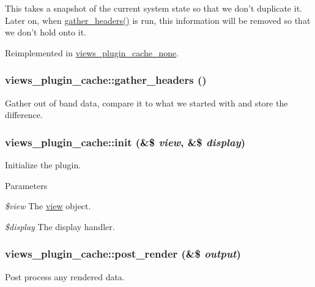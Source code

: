 This takes a snapshot of the current system state so that we don't duplicate it. Later on, when \hyperlink{classviews__plugin__cache_a557cef7540eec7d0a6ad9cd030724ef7}{gather\_\-headers()} is run, this information will be removed so that we don't hold onto it. 

Reimplemented in \hyperlink{classviews__plugin__cache__none_a17f65a53d00a8c51865027c3bce8172a}{views\_\-plugin\_\-cache\_\-none}.\hypertarget{classviews__plugin__cache_a557cef7540eec7d0a6ad9cd030724ef7}{
\subsubsection[{gather\_\-headers}]{\setlength{\rightskip}{0pt plus 5cm}views\_\-plugin\_\-cache::gather\_\-headers ()}}
\label{classviews__plugin__cache_a557cef7540eec7d0a6ad9cd030724ef7}
Gather out of band data, compare it to what we started with and store the difference. \hypertarget{classviews__plugin__cache_a6cecf3993f6314215559c6a914f8a96b}{
\subsubsection[{init}]{\setlength{\rightskip}{0pt plus 5cm}views\_\-plugin\_\-cache::init (\&\$ {\em view}, \/  \&\$ {\em display})}}
\label{classviews__plugin__cache_a6cecf3993f6314215559c6a914f8a96b}
Initialize the plugin.


\begin{DoxyParams}{Parameters}
\item[{\em \$view}]The \hyperlink{classview}{view} object. \item[{\em \$display}]The display handler. \end{DoxyParams}
\hypertarget{classviews__plugin__cache_aac0aacd51f591fd161fb5fb1d735e3a8}{
\subsubsection[{post\_\-render}]{\setlength{\rightskip}{0pt plus 5cm}views\_\-plugin\_\-cache::post\_\-render (\&\$ {\em output})}}
\label{classviews__plugin__cache_aac0aacd51f591fd161fb5fb1d735e3a8}
Post process any rendered data.

